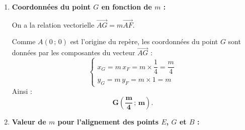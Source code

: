 \documentclass[11pt,a4paper]{article}
\newcommand{\vect}[1]{\overrightarrow{#1}}
\begin{document}
\begin{correctionbox}
\begin{enumerate}
\begin{itemize}[leftmargin=*,itemsep=3pt]
        En coordonnées :
        \[
        \begin{cases}
        3(x_D - x_F) + (x_C - x_F) = 0 \\
        3(y_D - y_F) + (y_C - y_F) = 0
        \end{cases}
        \iff
        \begin{cases}
        3(0 - x_F) + (1 - x_F) = 0 \\
        3(1 - y_F) + (1 - y_F) = 0
        \end{cases}
        \]
        Résolvons chacune des deux équations scalaires :
        \[
        -3x_F + 1 - x_F = 0 \iff -4x_F + 1 = 0 \iff 4x_F = 1 \iff x_F = \frac{1}{4}.
        \]
        \[
        3 - 3y_F + 1 - y_F = 0 \iff 4 - 4y_F = 0 \iff 4y_F = 4 \iff y_F = 1.
        \]
        D'où :
        \[
        \mathbf{F\left(\frac{1}{4}\,;\,1\right)}.
        \]
        \textit{(Remarque barycentrique : $F$ est le barycentre de $\{(D, 3), (C, 1)\}$, donc $\vect{DF} = \dfrac{1}{4}\vect{DC} = \dfrac{1}{4}\vect{AB}$)}.
    \end{itemize}

    \item \textbf{Coordonnées du point $G$ en fonction de $m$ :}
    
    On a la relation vectorielle $\vect{AG} = m\vect{AF}$.
    
    Comme $A(0\,;\,0)$ est l'origine du repère, les coordonnées du point $G$ sont données par les composantes du vecteur $\vect{AG}$ :
    \[
    \begin{cases}
    x_G = m\, x_F = m \times \dfrac{1}{4} = \dfrac{m}{4} \\[6pt]
    y_G = m\, y_F = m \times 1 = m
    \end{cases}
    \]
    Ainsi :
    \[
    \mathbf{G\left(\frac{m}{4}\,;\, m\right)}.
    \]

    \item \textbf{Valeur de $m$ pour l'alignement des points $E$, $G$ et $B$ :}
    

\end{enumerate}
\end{correctionbox}
\end{document}
